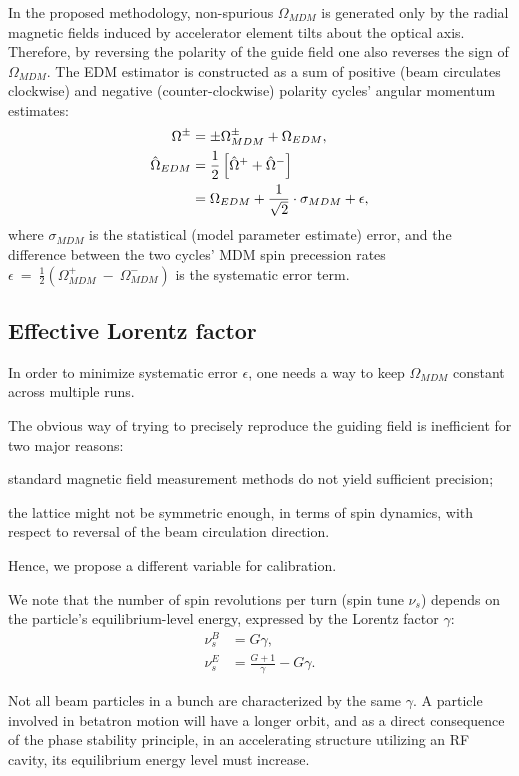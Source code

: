 \documentclass[a4paper]{jpconf}
\newcommand{\W}{\Omega}
\begin{document}
In the proposed methodology, non-spurious $\W_{MDM}$ is generated only by the radial magnetic fields induced by accelerator element tilts about the optical axis. Therefore, by reversing the polarity of the guide field one also reverses the sign of $\W_{MDM}$. The EDM estimator is constructed as a sum of positive (beam circulates clockwise) and negative (counter-clockwise) polarity cycles' angular momentum estimates:
\begin{align}
\W^{\pm} &= \pm \W_{MDM}^\pm + \W_{EDM},\\
\hat\W_{EDM} &= \frac12\left[\hat\W^+ + \hat\W^-\right] \notag\\
&= \W_{EDM} + \frac{1}{\sqrt{2}}\cdot\sigma_{MDM} + \epsilon,	\label{eq:EDM-estimator}
\end{align}
where
$\sigma_{MDM}$ is  the statistical (model parameter estimate) error, and the difference between the two cycles' MDM spin precession rates $\epsilon~=~\frac12\left(\W_{MDM}^+~-~\W_{MDM}^-\right)$ is the  systematic error term.

\subsection{Effective Lorentz factor}
In order to minimize systematic error $\epsilon$, one needs a way to keep $\W_{MDM}$ constant across multiple runs.

The obvious way of trying to precisely reproduce the guiding field is inefficient for two major reasons:
\begin{enumerate*}[(1)]
	\item standard magnetic field measurement methods do not yield sufficient precision;
	\item the lattice might not be symmetric enough, in terms of spin dynamics, with respect to reversal of the beam circulation direction.
\end{enumerate*}
Hence, we propose a different variable for calibration.

We note that the number of spin revolutions per turn (spin tune $\nu_s$) depends on the particle's  equilibrium-level energy, expressed by the Lorentz factor $\gamma$:
\begin{align}\label{eq:spin_tune_vs_gamma}
\nu_s^B &= G\gamma, \tag{magnetic field}\\
\nu_s^E &= \frac{G+1}{\gamma} - G\gamma. \tag{electric field}
\end{align}

Not all beam particles in a bunch are characterized by the same $\gamma$. A particle involved in betatron
motion will have a longer orbit, and as a direct consequence of the phase stability principle,
in an accelerating structure utilizing an RF cavity, its equilibrium energy level 
must increase.
\end{document}
